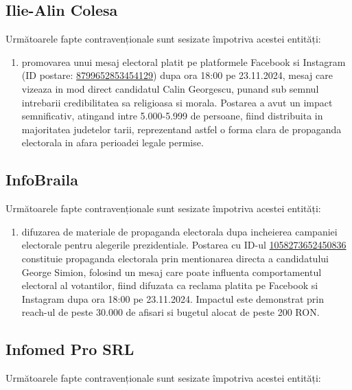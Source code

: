 \documentclass[a4paper,12pt]{article}
\begin{document}
\vspace{0.5cm}

\subsection{Ilie-Alin Colesa}
Următoarele fapte contravenționale sunt sesizate împotriva acestei entități:

\begin{enumerate}[leftmargin=*, label=\arabic*.)]
    \item promovarea unui mesaj electoral platit pe platformele Facebook si Instagram (ID postare: \href{https://www.facebook.com/ads/library/?id=8799652853454129}{8799652853454129}) dupa ora 18:00 pe 23.11.2024, mesaj care vizeaza in mod direct candidatul Calin Georgescu, punand sub semnul intrebarii credibilitatea sa religioasa si morala. Postarea a avut un impact semnificativ, atingand intre 5.000-5.999 de persoane, fiind distribuita in majoritatea judetelor tarii, reprezentand astfel o forma clara de propaganda electorala in afara perioadei legale permise.
\end{enumerate}

\vspace{0.5cm}

\subsection{InfoBraila}
Următoarele fapte contravenționale sunt sesizate împotriva acestei entități:

\begin{enumerate}[leftmargin=*, label=\arabic*.)]
    \item difuzarea de materiale de propaganda electorala dupa incheierea campaniei electorale pentru alegerile prezidentiale. Postarea cu ID-ul \href{https://www.facebook.com/ads/library/?id=1058273652450836}{1058273652450836} constituie propaganda electorala prin mentionarea directa a candidatului George Simion, folosind un mesaj care poate influenta comportamentul electoral al votantilor, fiind difuzata ca reclama platita pe Facebook si Instagram dupa ora 18:00 pe 23.11.2024. Impactul este demonstrat prin reach-ul de peste 30.000 de afisari si bugetul alocat de peste 200 RON.
\end{enumerate}

\vspace{0.5cm}

\subsection{Infomed Pro SRL}
Următoarele fapte contravenționale sunt sesizate împotriva acestei entități:
\end{document}
